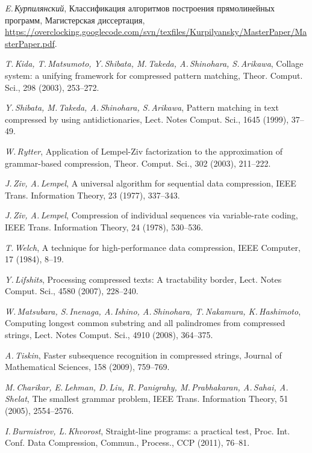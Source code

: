 \documentclass[14pt]{article}
\begin{document}
\begin{thebibliography}{99}

\textsl{E.\,Курпилянский}, Классификация алгоритмов построения прямолинейных программ, Магистерская диссертация, \url{https://overclocking.googlecode.com/svn/texfiles/Kurpilyansky/MasterPaper/MasterPaper.pdf}.

\textsl{T.\,Kida, T.\,Matsumoto, Y.\,Shibata, M.\,Takeda, A.\,Shinohara, S.\,Arikawa}, Collage system: a unifying
framework for compressed pattern matching, Theor. Comput. Sci., 298 (2003), 253--272.

\textsl{Y.\,Shibata, M.\,Takeda, A.\,Shinohara, S.\,Arikawa}, Pattern matching in text compressed by using
antidictionaries, Lect. Notes Comput. Sci., 1645 (1999), 37--49.

\textsl{W.\,Rytter}, Application of {L}empel-{Z}iv factorization to the approximation of grammar-based compression,
Theor. Comput. Sci., 302 (2003), 211--222.

\textsl{J.\,Ziv, A.\,Lempel}, A universal algorithm for sequential data compression, IEEE Trans. Information Theory, 23 (1977), 337--343.

\textsl{J.\,Ziv, A.\,Lempel}, Compression of individual sequences via variable-rate coding, IEEE Trans. Information Theory, 24 (1978),
530--536.

\textsl{T.\,Welch}, A technique for high-performance data compression, IEEE Computer, 17 (1984), 8--19.

\textsl{Y.\,Lifshits}, Processing compressed texts: A tractability border, Lect. Notes Comput. Sci., 4580 (2007), 228--240.

\textsl{W.\,Matsubara, S.\,Inenaga, A.\,Ishino, A.\,Shinohara, T.\,Nakamura, K.\,Hashimoto}, Computing longest common
substring and all palindromes from compressed strings, Lect. Notes Comput. Sci., 4910 (2008), 364--375.

\textsl{A.\,Tiskin}, Faster subsequence recognition in compressed strings, Journal of Mathematical Sciences, 158 (2009),
759--769.

\textsl{M.\,Charikar, E.\,Lehman,  D.\,Liu, R.\,Panigrahy, M.\,Prabhakaran, A.\,Sahai, A.\,Shelat}, The smallest grammar problem, IEEE
Trans. Information Theory, 51 (2005), 2554--2576.

\textsl{I.\,Burmistrov, L.\,Khvorost}, Straight-line programs: a practical test, Proc. Int. Conf. Data Compression, Commun., Process., CCP
(2011), 76--81.


\end{thebibliography}
\end{document}
